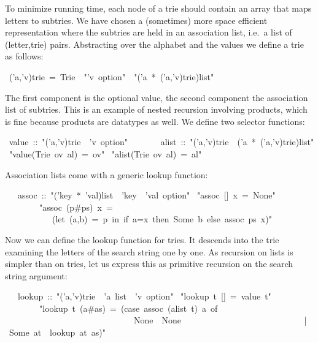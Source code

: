 \begin{isabelle}%
%
\begin{isamarkuptext}%
To minimize running time, each node of a trie should contain an array that maps
letters to subtries. We have chosen a (sometimes) more space efficient
representation where the subtries are held in an association list, i.e.\ a
list of (letter,trie) pairs.  Abstracting over the alphabet  and the
values  we define a trie as follows:%
\end{isamarkuptext}%
~('a,'v)trie~=~Trie~~{"}'v~option{"}~~{"}('a~*~('a,'v)trie)list{"}%
\begin{isamarkuptext}%
\noindent
The first component is the optional value, the second component the
association list of subtries.  This is an example of nested recursion involving products,
which is fine because products are datatypes as well.
We define two selector functions:%
\end{isamarkuptext}%
~value~::~{"}('a,'v)trie~{\isasymRightarrow}~'v~option{"}\isanewline
~~~~~~~alist~::~{"}('a,'v)trie~{\isasymRightarrow}~('a~*~('a,'v)trie)list{"}\isanewline
{}~{"}value(Trie~ov~al)~=~ov{"}\isanewline
{}~{"}alist(Trie~ov~al)~=~al{"}%
\begin{isamarkuptext}%
\noindent
Association lists come with a generic lookup function:%
\end{isamarkuptext}%
~~~assoc~::~{"}('key~*~'val)list~{\isasymRightarrow}~'key~{\isasymRightarrow}~'val~option{"}\isanewline
{}~{"}assoc~[]~x~=~None{"}\isanewline
~~~~~~~~{"}assoc~(p\#ps)~x~=\isanewline
~~~~~~~~~~~(let~(a,b)~=~p~in~if~a=x~then~Some~b~else~assoc~ps~x){"}%
\begin{isamarkuptext}%
Now we can define the lookup function for tries. It descends into the trie
examining the letters of the search string one by one. As
recursion on lists is simpler than on tries, let us express this as primitive
recursion on the search string argument:%
\end{isamarkuptext}%
~~~lookup~::~{"}('a,'v)trie~{\isasymRightarrow}~'a~list~{\isasymRightarrow}~'v~option{"}\isanewline
{}~{"}lookup~t~[]~=~value~t{"}\isanewline
~~~~~~~~{"}lookup~t~(a\#as)~=~(case~assoc~(alist~t)~a~of\isanewline
~~~~~~~~~~~~~~~~~~~~~~~~~~~~~~None~{\isasymRightarrow}~None\isanewline
~~~~~~~~~~~~~~~~~~~~~~~~~~~~|~Some~at~{\isasymRightarrow}~lookup~at~as){"}%
\begin{isamarkuptext}%

\end{isamarkuptext}
\end{isabelle}

